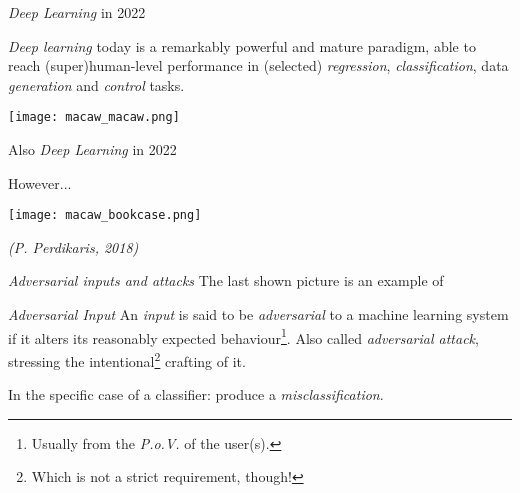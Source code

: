 
\begin{frame}{ \textit{Deep Learning} in 2022}

\textit{Deep learning} today is a remarkably powerful and mature paradigm, able to reach (super)human-level performance in (selected) \textit{regression}, \textit{classification}, data \textit{generation} and \textit{control} tasks.

\center \texttt{[image: macaw\_macaw.png]}
\end{frame}

\begin{frame}{ Also \textit{Deep Learning} in 2022}

    However...

\center \texttt{[image: macaw\_bookcase.png]}

\hspace*{14px}\textit{(P. Perdikaris, 2018)}
\end{frame}
\setcounter{footnote}{0}

\begin{frame}{ \textit{Adversarial inputs and attacks}}
    The last shown picture is an example of
    \hfill\break
    \begin{block}{\textit{Adversarial Input}}
        An \textit{input} is said to be \textit{adversarial} to a machine learning system if it alters its \alert{reasonably} expected behaviour\footnote{Usually from the \textit{P.o.V.} of the user(s).}. Also called \textit{adversarial attack}, stressing the intentional\footnote{Which is not a strict requirement, though!} crafting of it.
    \end{block}

In the specific case of a classifier: produce a \textit{misclassification}.
\end{frame}


